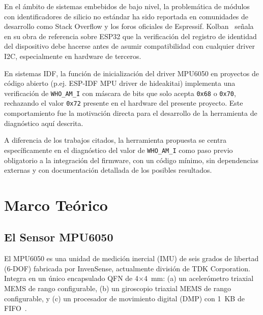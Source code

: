 \documentclass[10pt,twocolumn,a4paper]{article}
\begin{document}
En el ámbito de sistemas embebidos de bajo nivel, la problemática de
módulos con identificadores de silicio no estándar ha sido reportada
en comunidades de desarrollo como Stack Overflow y los foros oficiales
de Espressif. Kolban~\cite{kolban2017} señala en su obra de referencia
sobre ESP32 que la verificación del registro de identidad del dispositivo
debe hacerse antes de asumir compatibilidad con cualquier driver I2C,
especialmente en hardware de terceros.

En sistemas IDF, la función de inicialización del driver MPU6050 en
proyectos de código abierto (p.ej. ESP-IDF MPU driver de hideakitai)
implementa una verificación de \texttt{WHO\_AM\_I} con máscara de bits
que solo acepta \texttt{0x68} o \texttt{0x70}, rechazando el valor
\texttt{0x72} presente en el hardware del presente proyecto. Este
comportamiento fue la motivación directa para el desarrollo de la
herramienta de diagnóstico aquí descrita.

A diferencia de los trabajos citados, la herramienta propuesta se centra
específicamente en el diagnóstico del valor de \texttt{WHO\_AM\_I} como
paso previo obligatorio a la integración del firmware, con un código
mínimo, sin dependencias externas y con documentación detallada de los
posibles resultados.

\section{Marco Teórico}
\label{sec:teoria}

\subsection{El Sensor MPU6050}

El MPU6050 es una unidad de medición inercial (IMU) de seis grados de
libertad (6-DOF) fabricada por InvenSense, actualmente división de
TDK Corporation. Integra en un único encapsulado QFN de 4$\times$4~mm:
(a) un acelerómetro triaxial MEMS de rango configurable, (b) un
giroscopio triaxial MEMS de rango configurable, y (c) un procesador
de movimiento digital (DMP) con 1~KB de FIFO~\cite{invensense2013}.
\end{document}
